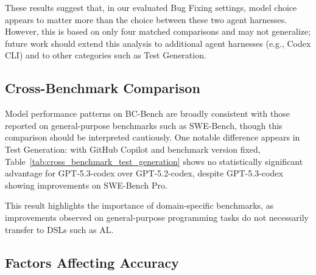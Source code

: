 \documentclass{article}
\begin{document}
These results suggest that, in our evaluated Bug Fixing settings, model choice appears to matter more than the choice between these two agent harnesses. However, this is based on only four matched comparisons and may not generalize; future work should extend this analysis to additional agent harnesses (e.g., Codex CLI) and to other categories such as Test Generation.

\subsection{Cross-Benchmark Comparison}

Model performance patterns on BC-Bench are broadly consistent with those reported on general-purpose benchmarks such as SWE-Bench, though this comparison should be interpreted cautiously. One notable difference appears in Test Generation: with GitHub Copilot and benchmark version fixed, Table~\ref{tab:cross_benchmark_test_generation} shows no statistically significant advantage for GPT-5.3-codex over GPT-5.2-codex, despite GPT-5.3-codex showing improvements on SWE-Bench Pro.

\begin{table}[t]
\vskip 0.05in
\begin{center}
\begin{small}
\end{small}
\end{center}
\caption{Matched comparisons on Test Generation with harness and benchmark version fixed. Values are mean resolution rates.}
\label{tab:cross_benchmark_test_generation}
\vskip 0.1in
\end{table}

This result highlights the importance of domain-specific benchmarks, as improvements observed on general-purpose programming tasks do not necessarily transfer to DSLs such as AL.

\subsection{Factors Affecting Accuracy}
\end{document}
